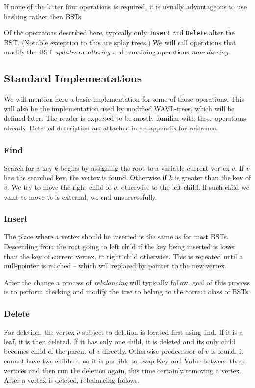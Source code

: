 If none of the latter four operations is required, it is usually advantageous to use hashing rather then BSTs.

Of the operations described here, typically only \texttt{Insert} and \texttt{Delete} alter the BST. (Notable exception to this are splay trees.) We will call operations that modify the BST {\em updates} or {\em altering} and remaining operations {\em non-altering}.

\subsection{Standard Implementations}

We will mention here a basic implementation for some of those operations. This will also be the implementation used by modified WAVL-trees, which will be defined later. The reader is expected to be mostly familiar with these operations already. Detailed description are attached in an appendix for reference.

\subsubsection*{Find}
Search for a key $k$ begins by assigning the root to a variable current vertex $v$. If $v$ has the searched key, the vertex is found. Otherwise if $k$ is greater than the key of $v$. We try to move the right child of $v$, otherwise to the left child. If such child we want to move to is external, we end unsuccessfully. 

\subsubsection*{Insert}
The place where a vertex should be inserted is the same as for most BSTs. Descending from the root going to left child if the key being inserted is lower than the key of current vertex, to right child otherwise. This is repeated until a null-pointer is reached -- which will replaced by pointer to the new vertex. 

After the change a process of \textit{rebalancing} will typically follow, goal of this process is to perform checking and modify the tree to belong to the correct class of BSTs.

\subsubsection*{Delete}
For deletion, the vertex $v$ subject to deletion is located first using find. If it is a leaf, it is then deleted. If it has only one child, it is deleted and its only child becomes child of the parent of $v$ directly. Otherwise predecessor of $v$ is found, it cannot have two children, so it is possible to swap Key and Value between those vertices and then run the deletion again, this time certainly removing a vertex. After a vertex is deleted, rebalancing follows.

